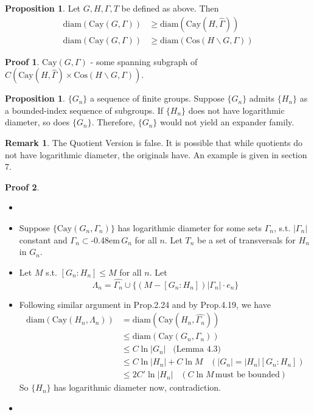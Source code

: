 \documentclass{book}
\newcommand{\syin}{$\subset$\kern-0.48em\raisebox{.20ex}{\tiny S}$\,$}
\newcommand{\diam}[1]{\textrm{diam}( #1 )}
\newcommand{\abs}[1]{\lvert #1 \rvert }
\newcommand{\Cay}[1]{\textrm{Cay}( #1 )}
\newcommand{\Cos}[1]{\textrm{Cos}( #1 )}
\theoremstyle{definition}
\newtheorem{proposition}[lemma]{Proposition}
\theoremstyle{remarkstyle}
\newtheorem*{remark}{Remark}%
\newtheorem*{myproof}{Proof}%
\begin{document}
\begin{proposition}
    Let $G,H,\Gamma,T$ be defined as above. Then 
    \begin{align*}
        \diam{\Cay{G,\Gamma}} &\ge \diam{\Cay{H,\hat{\Gamma}}} \\
        \diam{\Cay{G,\Gamma}} &\ge \diam{\Cos{H\backslash G, \Gamma}}
    \end{align*}
\end{proposition}
\begin{myproof}
    $\Cay{G,\Gamma}$ - some spanning subgraph of $C(\Cay{H,\hat{\Gamma}} \times \Cos{H\backslash G, \Gamma })$.\newline
\end{myproof}


\begin{proposition}
    $\{G_{n}\} $ a sequence of finite groups. Suppose $\{G_{n}\} $ admits $\{H_{n}\} $ as a bounded-index sequence of subgroups. If $\{H_{n}\} $ does not have logarithmic diameter, so does $\{G_{n}\} $. Therefore, $\{G_{n}\} $ would not yield an expander family.
\end{proposition}
\begin{remark}
    The Quotient Version is false. It is possible that while quotients do not have logarithmic diameter, the originals have. An example is given in section 7.
\end{remark}
\begin{myproof}
    \begin{itemize}
        \item[]
        \item Suppose $\{\Cay{G_{n}, \Gamma_{n}} \} $ has logarithmic diameter for some sets $\Gamma_{n} $, s.t. $\abs{\Gamma_{n}}$ constant and $\Gamma_{n} $\syin$G_{n} $ for all $n$. Let $T_{n} $ be a set of transversals for $H_{n} $ in $G_{n} $. 
        \item Let $M$ s.t. $[G_{n}:H_{n}]\le M $ for all $n$. Let $$
        \Lambda_{n} = \hat{\Gamma_{n}} \cup \{(M-[G_{n}:H_{n}])\abs{\Gamma_{n}}\cdot e_{n}\}
        $$
        \item Following similar argument in Prop.2.24 and by Prop.4.19, we have 
        \begin{align*}
            \diam{\Cay{H_{n},\Lambda_{n}}} &= \diam{\Cay{H_{n},\hat{\Gamma_{n}}}} \\
            &\le \diam{\Cay{G_{n},\Gamma_{n}}} \\
            &\le C\ln\abs{G_{n}} \;\;\; \textrm{(Lemma 4.3)} \\
            &\le C\ln\abs{H_{n}} + C\ln M \;\;\; (\abs{G_{n}} = \abs{H_{n}}[G_{n}:H_{n}]) \\
            &\le 2C'\ln\abs{H_{n}} \;\;\; (C\ln M \, \textrm{must be bounded})
        \end{align*}
        So $\{H_{n}\} $ has logarithmic diameter now, contradiction.
        \item[] 
    \end{itemize}
\end{myproof}
\end{document}

